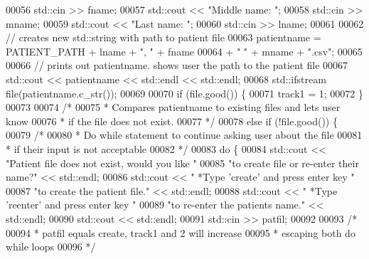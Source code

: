 \begin{DoxyCode}
00056             std::cin >> fname;
00057             std::cout << \textcolor{stringliteral}{"Middle name: "};
00058             std::cin >> mname;
00059             std::cout << \textcolor{stringliteral}{"Last name: "};
00060             std::cin >> lname;
00061 
00062             \textcolor{comment}{// creates new std::string with path to patient file}
00063             patientname = PATIENT\_PATH + lname + \textcolor{stringliteral}{", "} + fname
00064                 + \textcolor{stringliteral}{" "} + mname + \textcolor{stringliteral}{".csv"};
00065 
00066             \textcolor{comment}{// prints out patientname. shows user the path to the patient file}
00067             std::cout << patientname << std::endl << std::endl;
00068             std::ifstream file(patientname.c\_str());
00069 
00070             \textcolor{keywordflow}{if} (file.good()) \{
00071                 track1 = 1;
00072             \}
00073 
00074             \textcolor{comment}{/*}
00075 \textcolor{comment}{             * Compares patientname to existing files and lets user know}
00076 \textcolor{comment}{             * if the file does not exist.}
00077 \textcolor{comment}{             */}
00078             \textcolor{keywordflow}{else} \textcolor{keywordflow}{if} (!file.good()) \{
00079                 \textcolor{comment}{/* }
00080 \textcolor{comment}{                 * Do while statement to continue asking user about the file}
00081 \textcolor{comment}{                 * if their input is not acceptable}
00082 \textcolor{comment}{                 */} 
00083                 \textcolor{keywordflow}{do} \{
00084                     std::cout << \textcolor{stringliteral}{"Patient file does not exist, would you like "}
00085                         \textcolor{stringliteral}{"to create file or re-enter their name?"} << std::endl;
00086                     std::cout << \textcolor{stringliteral}{"  *Type 'create' and press enter key "}
00087                         \textcolor{stringliteral}{"to create the patient file."} << std::endl;
00088                     std::cout << \textcolor{stringliteral}{"  *Type 'reenter' and press enter key "}
00089                         \textcolor{stringliteral}{"to re-enter the patients name."} << std::endl;
00090                     std::cout << std::endl;
00091                     std::cin >> patfil;
00092 
00093                     \textcolor{comment}{/* }
00094 \textcolor{comment}{                     * patfil equals create, track1 and 2 will increase}
00095 \textcolor{comment}{                     * escaping both do while loops}
00096 \textcolor{comment}{                     */}

\end{DoxyCode}
